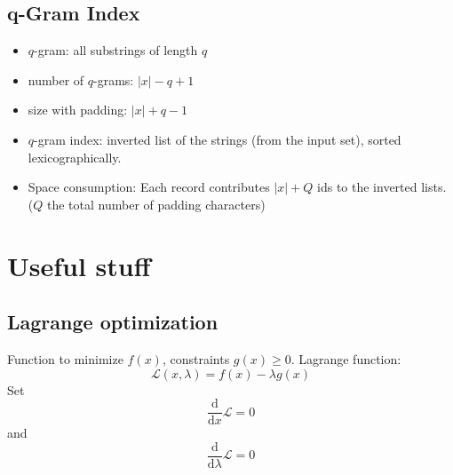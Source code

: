 \documentclass[a4paper]{scrartcl}
\begin{document}
\subsection{q-Gram Index}
\label{sec:q_gram_index}
\begin{itemize}
\item $q$-gram: all substrings of length $q$
\item number of $q$-grams: $|x|-q+1$
\item size with padding: $|x|+q-1$
\item $q$-gram index: inverted list of the strings (from the input set), sorted
  lexicographically.
\item Space consumption: Each record contributes $|x|+Q$ ids to the inverted
  lists. ($Q$ the total number of padding characters)
\end{itemize}


\section{Useful stuff}

\subsection{Lagrange optimization}
Function to minimize $f(x)$, constraints $g(x)\ge 0$. Lagrange function:
\[\mathcal{L}(x,\lambda)=f(x)-\lambda g(x)\]
Set
\[\frac{\mathrm{d}}{\mathrm{d}x}\mathcal{L}=0\] and
\[\frac{\mathrm{d}}{\mathrm{d}\lambda}\mathcal{L}=0\]

\end{document}
